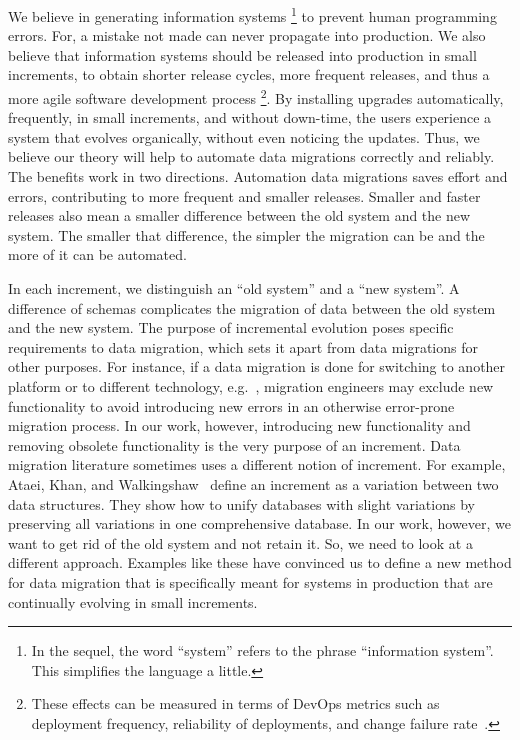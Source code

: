 \documentclass{elsarticle}
\begin{document}
   We believe in generating information systems%
\footnote{In the sequel, the word ``system'' refers to the phrase ``information system''. This simplifies the language a little. }
   to prevent human programming errors.
   For, a mistake not made can never propagate into production.
   We also believe that information systems should be released into production in small increments,
   to obtain shorter release cycles, more frequent releases, and thus a more agile software development process%
   \footnote{These effects can be measured in terms of DevOps metrics such as
   deployment frequency,
   reliability of deployments, and
   change failure rate~\cite{DevOps2021}.}.
   By installing upgrades automatically, frequently, in small increments, and without down-time,
   the users experience a system that evolves organically, without even noticing the updates.
   Thus, we believe our theory will help to automate data migrations correctly and reliably.
   The benefits work in two directions.
   Automation data migrations saves effort and errors,
   contributing to more frequent and smaller releases.
   Smaller and faster releases also mean a smaller difference between the old system and the new system.
   The smaller that difference, the simpler the migration can be and the more of it can be automated.

   In each increment, we distinguish an ``old system'' and a ``new system''.
   A difference of schemas complicates the migration of data between the old system and the new system.
   The purpose of incremental evolution poses specific requirements to data migration,
   which sets it apart from data migrations for other purposes.
   For instance, if a data migration is done for switching to another platform or to different technology,
   e.g.~\cite{Gholami2016,Bisbal1999},
   migration engineers may exclude new functionality to avoid introducing new errors in an otherwise error-prone migration process.
   In our work, however, introducing new functionality and removing obsolete functionality is the very purpose of an increment.
   Data migration literature sometimes uses a different notion of increment.
   For example, Ataei, Khan, and Walkingshaw~\cite{Ataei2021,Walkingshaw2014} define an increment as a variation between two data structures.
   They show how to unify databases with slight variations by preserving all variations in one comprehensive database.
   In our work, however, we want to get rid of the old system and not retain it.
   So, we need to look at a different approach.
   Examples like these have convinced us to define a new method for data migration that is specifically meant for systems in production that are
   continually evolving in small increments.
   
\end{document}
